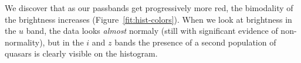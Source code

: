 We discover that as our passbands get progressively more red, the bimodality of the brightness increases (Figure~\ref{fit:hist-colors}). When we look at brightness in the $u$ band, the data looks \emph{almost} normaly (still with significant evidence of non-normality), but in the $i$ and $z$ bands the presence of a second population of quasars is clearly visible on the histogram.